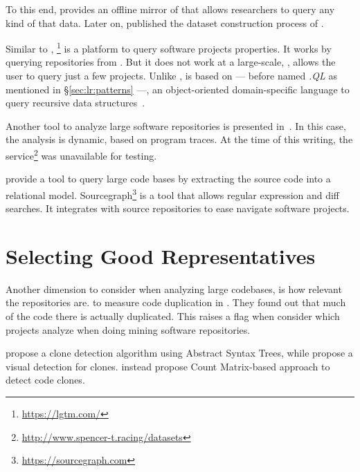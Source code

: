 To this end, \cite{gousiosGHTorentDatasetTool2013} provides an offline mirror of \github{} that allows researchers to query any kind of that data.
Later on, \cite{gousiosLeanGHTorrentGitHub2014} published the dataset construction process of \github{}.

Similar to \boa{}, \lgtm{}\footnote{\url{https://lgtm.com/}} is a platform to query software projects properties.
It works by querying repositories from \github{}.
But it does not work at a large-scale, \ie{}, \lgtm{} allows the user to query just a few projects.
Unlike \boa{}, \lgtm{} is based on \ql{} --- before named \emph{.QL} as mentioned in \S\ref{sec:lr:patterns} ---, an object-oriented domain-specific language to query recursive data structures~\cite{avgustinovQLObjectorientedQueries2016}.


Another tool to analyze large software repositories is presented in~\cite{brandauerSpencerInteractiveHeap2017}.
In this case, the analysis is dynamic, based on program traces. 
At the time of this writing, the service\footnote{\url{http://www.spencer-t.racing/datasets}} was unavailable for testing. 

\cite{bajracharyaSourcererInternetscaleSoftware2009} provide a tool to query large code bases by extracting the source code into a relational model.
Sourcegraph\footnote{\url{https://sourcegraph.com}} is a tool that allows regular expression and diff searches.
It integrates with source repositories to ease navigate software projects.

\section{Selecting Good Representatives}
\label{sec:lr:selection}

Another dimension to consider when analyzing large codebases, is how relevant the repositories are.
\cite{lopesDeJaVuMapCode2017}  to measure code duplication in \github{}.
They found out that much of the code there is actually duplicated.
This raises a flag when consider which projects analyze when doing mining software repositories.

\cite{baxterCloneDetectionUsing1998} propose a clone detection algorithm using Abstract Syntax Trees,
while \cite{riegerVisualDetectionDuplicated} propose a visual detection for clones.
\cite{yuanCMCDCountMatrix2011,chenReplicationReproductionCode} instead propose Count Matrix-based approach to detect code clones.

